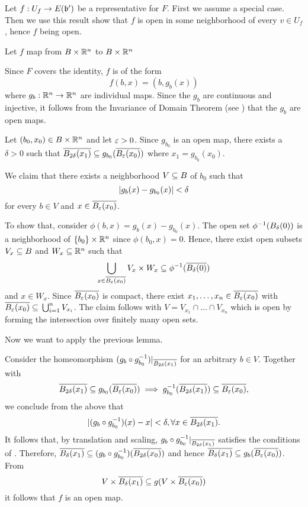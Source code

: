 \begin{myproof}
    Let $f: U_f \to E(\bb')$ be a representative for $F$.
    First we assume a special case. Then we use this result show that $f$
    is open in some neighborhood of every $v \in U_f$, hence $f$ being open.
    \begin{steps}
        \item Let $f$ map from $B \times \mathbb{R}^n$ to $B \times \mathbb{R}^n$
        
        Since $F$ covers the identity, $f$ is of the form
        \[ f(b, x) = (b, g_b(x)) \]
        where $g_b: \mathbb{R}^n \to \mathbb{R}^n$ are individual maps.
        Since the $g_b$ are continuous and injective,
        it follows from the Invariance of Domain Theorem (see \cite[cor.19.9]{brendon}) that the $g_b$ are open maps.
        
        Let $(b_0, x_0) \in B \times \mathbb{R}^n$ and let $\varepsilon{} > 0$.
        Since $g_{b_0}$ is an open map, there exists a $\delta > 0$ such that
        $\clball[2\delta][x_1] \sub g_{b_0}(\clball[\eps][x_0])$ where $x_1 = g_{b_0}(x_0)$.

        We claim that there exists a neighborhood $V \subseteq{} B$ of $b_0$ such that
        \[ \vert{} g_b(x) - g_{b_0}(x) \vert{} < \delta \]
        for every $b \in V$ and $x \in \clball[\eps][x_0]$.
        
        To show that, consider $\phi(b, x) = g_b(x) - g_{b_0}(x)$.
        The open set $\inv{\phi}(\ball[\delta])$ is a neighborhood of $\{b_0\} \times \mathbb{R}^n$ since $\phi(b_0, x) = 0$.
        Hence, there exist open subsets $V_x \subseteq{} B$ and $W_x \subseteq{} \mathbb{R}^n$ such that
        \[ \bigcup_{x \in \clball[\eps][x_0]} V_x \cross W_x \sub \inv{\phi}(\clball[\delta]) \]
        and $x \in W_x$.
        Since $\clball[\eps][x_0]$ is compact, there exist $x_1, \dots, x_n \in \clball[\eps][x_0]$ with $\clball[\eps][x_0] \sub \bigcup_{i = 1}^{n} V_{x_i}$.
        The claim follows with $V = V_{x_1} \cap \dots \cap V_{x_n}$
        which is open by forming the intersection over finitely many open sets.

        Now we want to apply the previous lemma.

        Consider the homeomorphism
        $(g_b \circ \inv{g_{b_0}})\restr{\clball[2\delta][x_1]}$
        for an arbitrary $b \in V$.
        Together with
        \[ \clball[2\delta][x_1] \sub g_{b_0}(\clball[\eps][x_0]) \implies \inv{g_{b_0}}(\clball[2\delta][x_1]) \sub \clball[\eps][x_0], \]
        we conclude from the above that
        \[ \abs{(g_b \circ \inv{g_{b_0}})(x) - x} < \delta, \forall x \in \clball[2\delta][x_1]. \]
        It follows that, by translation and scaling, $g_b \circ \inv{g_{b_0}}\restr{\clball[2\delta][x_1]}$ satisfies the conditions of .
        Therefore, $\clball[\delta][x_1] \sub (g_b \circ \inv{g_{b_0}})(\clball[2\delta][x_0])$ and hence $\clball[\delta][x_1] \sub g_b(\clball[\eps][x_0])$.
        From
        \[ V \cross \clball[\delta][x_1] \sub g(V \cross \clball[\eps][x_0]) \]
        it follows that $f$ is an open map.


\end{steps}
\end{myproof}

